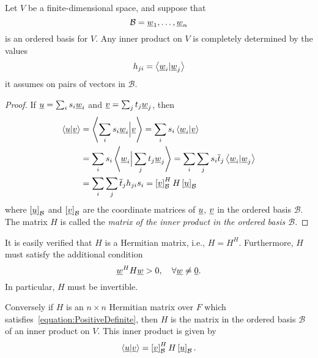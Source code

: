 \begin{theorem}
Let $V$ be a finite-dimensional space, and suppose that
\begin{equation*}
\mathcal{B} = \underline{w}_1, \ldots, \underline{w}_n
\end{equation*}
is an ordered basis for $V$.
Any inner product on $V$ is completely determined by the values
\begin{equation*}
h_{ji} = \left\langle \underline{w}_i | \underline{w}_j \right\rangle
\end{equation*}
it assumes on pairs of vectors in $\mathcal{B}$.
\end{theorem}
\begin{proof}
If $\underline{u} = \sum_{i} s_i \underline{w}_i$ and $\underline{v} = \sum_{j} t_j \underline{w}_j$, then
\begin{equation*}
\begin{split}
\left\langle \underline{u} | \underline{v} \right\rangle
&= \left\langle \sum_{i} s_i \underline{w}_i \Big| \underline{v} \right\rangle
= \sum_{i} s_i \left\langle \underline{w}_i | \underline{v} \right\rangle \\
&= \sum_{i} s_i \left\langle \underline{w}_i \Big| \sum_{j} t_j \underline{w}_j \right\rangle
= \sum_{i} \sum_{j} s_i \overline{t}_j \left\langle \underline{w}_i | \underline{w}_j \right\rangle \\
&= \sum_{i} \sum_{j} \overline{t}_j h_{ji} s_i
= \left[ \underline{v} \right]_{\mathcal{B}}^H H \left[ \underline{u} \right]_{\mathcal{B}}
\end{split}
\end{equation*}
where $\left[ \underline{u} \right]_{\mathcal{B}}$ and $\left[ \underline{v} \right]_{\mathcal{B}}$ are the coordinate matrices of $\underline{u}$, $\underline{v}$ in the ordered basis $\mathcal{B}$.
The matrix $H$ is called the \emph{matrix of the inner product in the ordered basis $\mathcal{B}$}.
\end{proof}

It is easily verified that $H$ is a Hermitian matrix, i.e., $H = H^H$.
Furthermore, $H$ must satisfy the additional condition
\begin{equation} \label{equation:PositiveDefinite}
\underline{w}^H H \underline{w} > 0, \quad \forall \underline{w} \neq \underline{0}.
\end{equation}
In particular, $H$ must be invertible.

Conversely if $H$ is an $n \times n$ Hermitian matrix over $F$ which satisfies~\eqref{equation:PositiveDefinite}, then $H$ is the matrix in the ordered basis $\mathcal{B}$ of an inner product on $V$.
This inner product is given by
\begin{equation*}
\left\langle \underline{u} | \underline{v} \right\rangle
= \left[ \underline{v} \right]_{\mathcal{B}}^H H \left[ \underline{u} \right]_{\mathcal{B}}.
\end{equation*}

